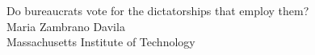 \begin{titlepage}
  \centering
  \vspace*{\fill}
  {\Large Do bureaucrats vote for the dictatorships that employ them?}\\
  \vspace{1em}
  Maria Zambrano Davila\\
  Massachusetts Institute of Technology
  \vspace*{\fill}
\end{titlepage}